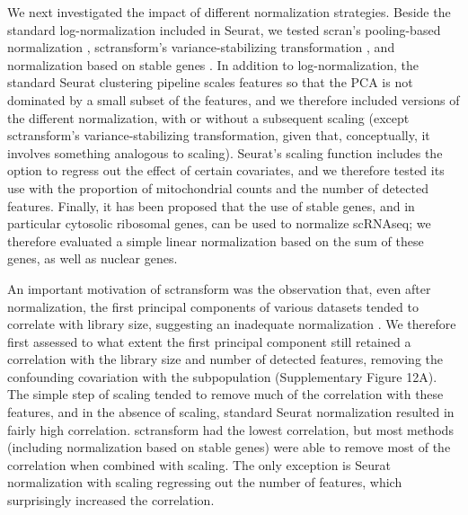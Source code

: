 \documentclass{bmcart}
\begin{document}
We next investigated the impact of different normalization strategies. Beside the standard log-normalization included in Seurat, we tested scran's pooling-based normalization \citep{lunPooling2016}, sctransform's variance-stabilizing transformation \citep{hafemeisterSCtransform2019}, and normalization based on stable genes \citep{linStableGenes2018, deekeStablyExpressed2018}. 
In addition to log-normalization, the standard Seurat clustering pipeline scales features so that the PCA is not dominated by a small subset of the features, and we therefore included versions of the different normalization, with or without a subsequent scaling (except sctransform's variance-stabilizing transformation, given that, conceptually, it involves something analogous to scaling). 
Seurat's scaling function includes the option to regress out the effect of certain covariates, and we therefore tested its use with the proportion of mitochondrial counts and the number of detected features. Finally, it has been proposed that the use of stable genes, and in particular cytosolic ribosomal genes, can be used to normalize scRNAseq; we therefore evaluated a simple linear normalization based on the sum of these genes, as well as nuclear genes.

An important motivation of sctransform was the observation that, even after normalization, the first principal components of various datasets tended to correlate with library size, suggesting an inadequate normalization \citep{hafemeisterSCtransform2019}. We therefore first assessed to what extent the first principal component still retained a correlation with the library size and number of detected features, removing the confounding covariation with the subpopulation (Supplementary Figure 12A). The simple step of scaling tended to remove much of the correlation with these features, and in the absence of scaling, standard Seurat normalization resulted in fairly high correlation. sctransform had the lowest correlation, but most methods (including normalization based on stable genes) were able to remove most of the correlation when combined with scaling. The only exception is Seurat normalization with scaling regressing out the number of features, which surprisingly increased the correlation.
\end{document}
